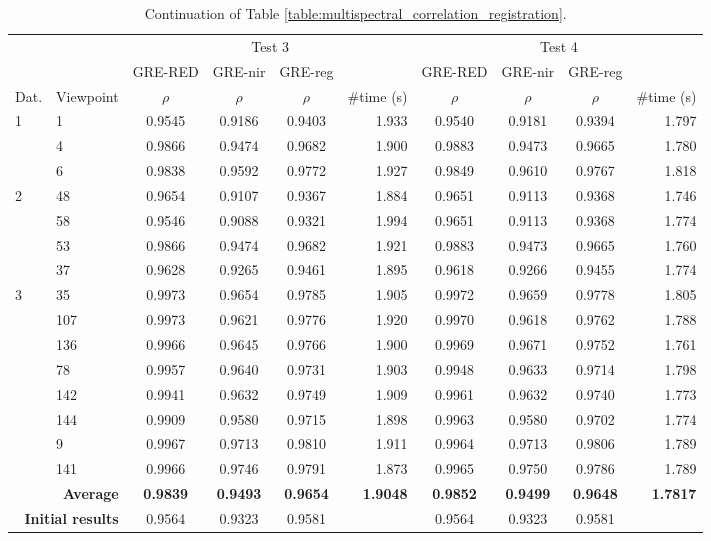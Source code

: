 \renewcommand{\arraystretch}{1.1}
\begin{table}
    \footnotesize
    \caption{Continuation of Table \ref{table:multispectral_correlation_registration}.}
    \begin{tabular}{ll|cccr|cccr}
        \toprule
        \multicolumn{2}{c}{} & \multicolumn{4}{c}{Test 3} & \multicolumn{4}{c}{Test 4}\\
        \cmidrule{1-10}
        & & GRE-RED & GRE-\acrshort{nir} & GRE-\acrshort{reg} & & GRE-RED & GRE-\acrshort{nir} & GRE-\acrshort{reg}\\
        Dat. & Viewpoint & $\rho$ & $\rho$ & $\rho$ & \#time (\si{\second}) & $\rho$ & $\rho$ & $\rho$ & \#time (\si{\second}) \\
        \cmidrule{1-10}
        \multirow{3}{*}{1} & 1 & 0.9545 & 0.9186 & 0.9403 & 1.933 & 0.9540 & 0.9181 & 0.9394 & 1.797\\
        & 4 & 0.9866 & 0.9474 & 0.9682 & 1.900 & 0.9883 & 0.9473 & 0.9665 & 1.780\\
        & 6 & 0.9838 & 0.9592 & 0.9772 & 1.927 & 0.9849 & 0.9610 & 0.9767 & 1.818\\
        \cmidrule{1-10}
        \multirow{4}{*}{2} & 48 & 0.9654 & 0.9107 & 0.9367 & 1.884 & 0.9651 & 0.9113 & 0.9368 & 1.746\\
        & 58 & 0.9546 & 0.9088 & 0.9321 & 1.994 & 0.9651 & 0.9113 & 0.9368 & 1.774\\
        & 53 & 0.9866 & 0.9474 & 0.9682 & 1.921 & 0.9883 & 0.9473 & 0.9665 & 1.760\\
        & 37 & 0.9628 & 0.9265 & 0.9461 & 1.895 & 0.9618 & 0.9266 & 0.9455 & 1.774\\
        \cmidrule{1-10}
        \multirow{8}{*}{3} & 35 & 0.9973 & 0.9654 & 0.9785 & 1.905 & 0.9972 & 0.9659 & 0.9778 & 1.805\\
        & 107 & 0.9973 & 0.9621 & 0.9776 & 1.920 & 0.9970 & 0.9618 & 0.9762 & 1.788\\
        & 136 & 0.9966 & 0.9645 & 0.9766 & 1.900 & 0.9969 & 0.9671 & 0.9752 & 1.761\\
        & 78 & 0.9957 & 0.9640 & 0.9731 & 1.903 & 0.9948 & 0.9633 & 0.9714 & 1.798\\
        & 142 & 0.9941 & 0.9632 & 0.9749 & 1.909 & 0.9961 & 0.9632 & 0.9740 & 1.773\\
        & 144 & 0.9909 & 0.9580 & 0.9715 & 1.898 & 0.9963 & 0.9580 & 0.9702 & 1.774\\
        & 9 & 0.9967 & 0.9713 & 0.9810 & 1.911 & 0.9964 & 0.9713 & 0.9806 & 1.789\\
        & 141 & 0.9966 & 0.9746 & 0.9791 & 1.873 & 0.9965 & 0.9750 & 0.9786 & 1.789\\
        \cmidrule{1-10}
        \multicolumn{2}{r|}{\textbf{Average}} & \textbf{0.9839} & \textbf{0.9493} & \textbf{0.9654} & \textbf{1.9048} & \textbf{0.9852} & \textbf{0.9499} & \textbf{0.9648} & \textbf{1.7817}\\
        \cmidrule{1-10}
        \multicolumn{2}{r|}{\textbf{Initial results}} & 0.9564 & 0.9323 & 0.9581 & & 0.9564 & 0.9323 & 0.9581 & \\
        \bottomrule
    \end{tabular}
    \normalsize
\end{table}
